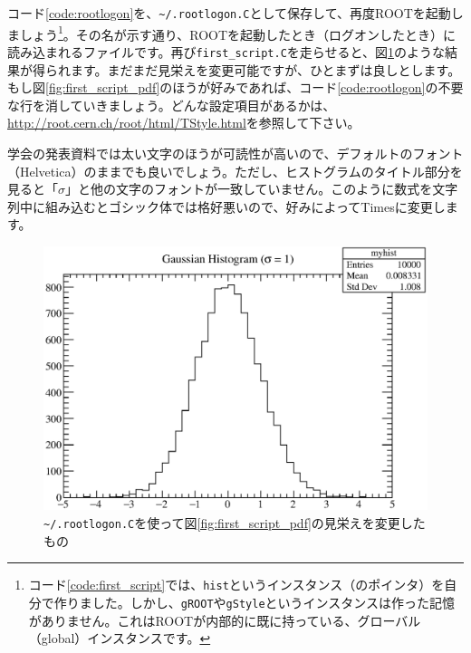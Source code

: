 コード\ref{code:rootlogon}を、\texttt{\~{}/.rootlogon.C}として保存して、再度ROOTを起動しましょう\footnote{コード\ref{code:first_script}では、\texttt{hist}というインスタンス（のポインタ）を自分で作りました。しかし、\texttt{gROOT}や\texttt{gStyle}というインスタンスは作った記憶がありません。これはROOTが内部的に既に持っている、グローバル（global）インスタンスです。}。その名が示す通り、ROOTを起動したとき（ログオンしたとき）に読み込まれるファイルです。再び\texttt{first\_script.C}を走らせると、図\ref{fig:first_script_mod_eps}のような結果が得られます。まだまだ見栄えを変更可能ですが、ひとまずは良しとします。もし図\ref{fig:first_script_pdf}のほうが好みであれば、コード\ref{code:rootlogon}の不要な行を消していきましょう。どんな設定項目があるかは、\url{http://root.cern.ch/root/html/TStyle.html}を参照して下さい。

学会の発表資料では太い文字のほうが可読性が高いので、デフォルトのフォント（Helvetica）のままでも良いでしょう。ただし、ヒストグラムのタイトル部分を見ると「$\sigma$」と他の文字のフォントが一致していません。このように数式を文字列中に組み込むとゴシック体では格好悪いので、好みによってTimesに変更します。

\begin{NoFloat}

\end{NoFloat}
\pagebreak

\begin{figure}
  \centering
  \includegraphics[width=12cm,clip]{fig/first_script_mod.eps}
  \caption{\texttt{\~{}/.rootlogon.C}を使って図\ref{fig:first_script_pdf}の見栄えを変更したもの}
  \label{fig:first_script_mod_eps}
\end{figure}

